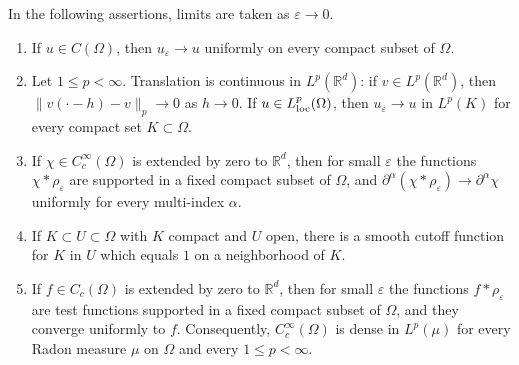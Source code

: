 \begin{lemma}\label{lem:mollifier-density}
In the following assertions, limits are taken as $\varepsilon\to0$.
\begin{enumerate}
\item If $u\in C(\Omega)$, then $u_\varepsilon\to u$ uniformly on every compact subset of $\Omega$.
\item Let $1\leq p<\infty$. Translation is continuous in $L^p(\mathbb R^d)$: if $v\in L^p(\mathbb R^d)$, then $\|v(\cdot-h)-v\|_p\to0$ as $h\to0$. If $u\in L^p_{\mathrm{loc}}(\Omega)$, then $u_\varepsilon\to u$ in $L^p(K)$ for every compact set $K\subset\Omega$.
\item If $\chi\in C_c^\infty(\Omega)$ is extended by zero to $\mathbb R^d$, then for small $\varepsilon$ the functions $\chi*\rho_\varepsilon$ are supported in a fixed compact subset of $\Omega$, and $\partial^\alpha(\chi*\rho_\varepsilon)\to\partial^\alpha\chi$ uniformly for every multi-index $\alpha$.
\item If $K\subset U\subset\Omega$ with $K$ compact and $U$ open, there is a smooth cutoff function for $K$ in $U$ which equals $1$ on a neighborhood of $K$.
\item If $f\in C_c(\Omega)$ is extended by zero to $\mathbb R^d$, then for small $\varepsilon$ the functions $f*\rho_\varepsilon$ are test functions supported in a fixed compact subset of $\Omega$, and they converge uniformly to $f$. Consequently, $C_c^\infty(\Omega)$ is dense in $L^p(\mu)$ for every Radon measure $\mu$ on $\Omega$ and every $1\leq p<\infty$.
\end{enumerate}
\end{lemma}
